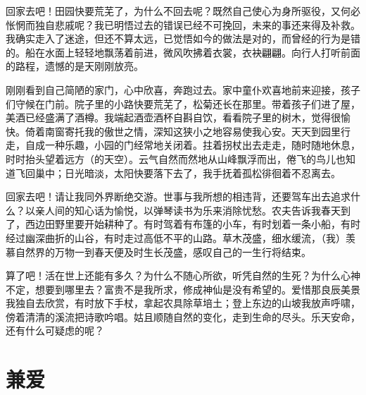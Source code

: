 \documentclass[12pt,UTF-8,openany,a4]{ctexbook}
\begin{document}
\begin{large}
    \yiwen 
    回家去吧！田园快要荒芜了，为什么不回去呢？既然自己使心为身所驱役，又何必怅惘而独自悲戚呢？我已明悟过去的错误已经不可挽回，未来的事还来得及补救。我确实走入了迷途，但还不算太远，已觉悟如今的做法是对的，而曾经的行为是错的。船在水面上轻轻地飘荡着前进，微风吹拂着衣裳，衣袂翩翩。向行人打听前面的路程，遗憾的是天刚刚放亮。
    
    刚刚看到自己简陋的家门，心中欣喜，奔跑过去。家中童仆欢喜地前来迎接，孩子们守候在门前。院子里的小路快要荒芜了，松菊还长在那里。带着孩子们进了屋，美酒已经盛满了酒樽。我端起酒壶酒杯自斟自饮，看看院子里的树木，觉得很愉快。倚着南窗寄托我的傲世之情，深知这狭小之地容易使我心安。天天到园里行走，自成一种乐趣，小园的门经常地关闭着。拄着拐杖出去走走，随时随地休息，时时抬头望着远方（的天空）。云气自然而然地从山峰飘浮而出，倦飞的鸟儿也知道飞回巢中；日光暗淡，太阳快要落下去了，我手抚着孤松徘徊着不忍离去。
    
    回家去吧！请让我同外界断绝交游。世事与我所想的相违背，还要驾车出去追求什么？以亲人间的知心话为愉悦，以弹琴读书为乐来消除忧愁。农夫告诉我春天到了，西边田野里要开始耕种了。有时驾着有布篷的小车，有时划着一条小船，有时经过幽深曲折的山谷，有时走过高低不平的山路。草木茂盛，细水缓流，（我）羡慕自然界的万物一到春天便及时生长茂盛，感叹自己的一生行将结束。
    
    算了吧！活在世上还能有多久？为什么不随心所欲，听凭自然的生死？为什么心神不定，想要到哪里去？富贵不是我所求，修成神仙是没有希望的。爱惜那良辰美景我独自去欣赏，有时放下手杖，拿起农具除草培土；登上东边的山坡我放声呼啸，傍着清清的溪流把诗歌吟唱。姑且顺随自然的变化，走到生命的尽头。乐天安命，还有什么可疑虑的呢？
    
\end{large}



\chapter{兼爱}
\end{document}
